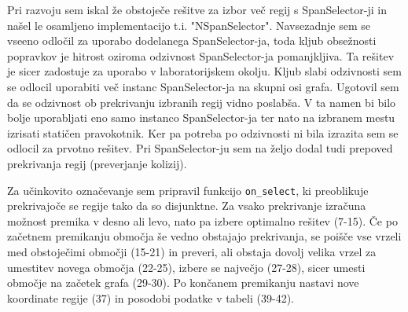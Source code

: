 \documentclass[a4paper,12pt]{article}
\begin{document}
Pri razvoju sem iskal že obstoječe rešitve za izbor več regij s SpanSelector-ji in našel le osamljeno implementacijo t.i. "NSpanSelector"\cite{nspanselector}. Navsezadnje sem se vseeno odločil za uporabo dodelanega SpanSelector-ja, toda kljub obsežnosti popravkov je hitrost oziroma odzivnost SpanSelector-ja pomanjkljiva. Ta rešitev je sicer zadostuje za uporabo v laboratorijskem okolju. Kljub slabi odzivnosti sem se odlocil uporabiti več instanc SpanSelector-ja na skupni osi grafa. Ugotovil sem da se odzivnost ob prekrivanju izbranih regij vidno poslabša. V ta namen bi bilo bolje uporabljati eno samo instanco SpanSelector-ja ter nato na izbranem mestu izrisati statičen pravokotnik. Ker pa potreba po odzivnosti ni bila izrazita sem se odlocil za prvotno rešitev. Pri SpanSelector-ju sem na željo dodal tudi prepoved prekrivanja regij (preverjanje kolizij).


Za učinkovito označevanje sem pripravil funkcijo \texttt{on\_select}, ki preoblikuje prekrivajoče se regije tako da so disjunktne.
Za vsako prekrivanje izračuna možnost premika v desno ali levo, nato pa izbere optimalno rešitev (7-15). Če po začetnem premikanju območja še vedno obstajajo prekrivanja, se poišče vse vrzeli med obstoječimi območji (15-21) in preveri, ali obstaja dovolj velika vrzel za umestitev novega območja (22-25), izbere se največjo (27-28), sicer umesti območje na začetek grafa (29-30). Po končanem premikanju nastavi nove koordinate regije (37) in posodobi podatke v tabeli (39-42).
\end{document}

